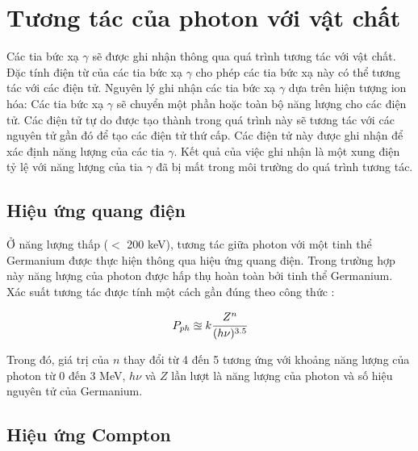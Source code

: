 \chapter{Tương tác của photon với vật chất}%
\label{ch:cosolythuyet}%

Các tia bức xạ $\gamma$ sẽ được ghi nhận thông qua quá trình tương tác với vật chất. Đặc tính điện từ của các tia bức xạ $\gamma$ cho phép các tia bức xạ này có thể tương tác với các điện tử. Nguyên lý ghi nhận các tia bức xạ $\gamma$ dựa trên hiện tượng ion hóa: Các tia bức xạ $\gamma$ sẽ chuyển một phần hoặc toàn bộ năng lượng cho các điện tử. Các điện tử tự do được tạo thành trong quá trình này sẽ tương tác với các nguyên tử gần đó để tạo các điện tử thứ cấp. Các điện tử này được ghi nhận để xác định năng lượng của các tia $\gamma$. Kết quả của việc ghi nhận là một xung điện tỷ lệ với năng lượng của tia $\gamma$ đã  bị mất trong môi trường do quá trình tương tác.%

\section{Hiệu ứng quang điện}%
Ở năng lượng thấp ($<$ 200 keV), tương tác giữa photon với một tinh thể Germanium được thực hiện thông qua hiệu ứng quang điện. Trong trường hợp này năng lượng của photon được hấp thụ hoàn toàn bởi tinh thể Germanium. Xác suất tương tác được tính một cách gần đúng theo công thức \cite{bib_Knoll, bib_ghinhanbucxa, bib_vatlyhatnhanungdung}:%

\begin{equation}%
	P_{ph}\approxeq k\cfrac{Z^{n}}{(h\nu)^{3.5}}
\label{equ:huquangdien}%
\end{equation}%

Trong đó, giá trị của $n$ thay đổi từ 4 đến 5 tương ứng với khoảng năng lượng của photon từ 0 đến 3 MeV, $h\nu$  và $Z$ lần lượt là năng lượng của photon và số hiệu nguyên tử của Germanium.%

\section{Hiệu ứng Compton}

